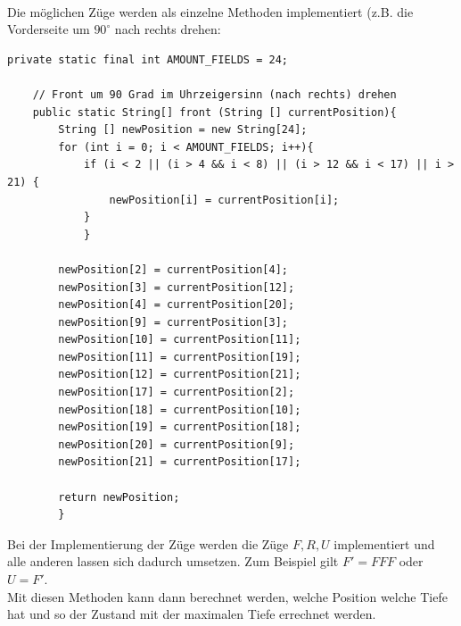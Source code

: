 \documentclass[12pt,a4paper, usenames, dvipsnames]{scrartcl}
\begin{document}
\\
Die möglichen Züge werden als einzelne Methoden implementiert (z.B. die Vorderseite um $90^\circ$ nach rechts drehen:
\begin{verbatim}
private static final int AMOUNT_FIELDS = 24;

    // Front um 90 Grad im Uhrzeigersinn (nach rechts) drehen
    public static String[] front (String [] currentPosition){
        String [] newPosition = new String[24];
        for (int i = 0; i < AMOUNT_FIELDS; i++){
            if (i < 2 || (i > 4 && i < 8) || (i > 12 && i < 17) || i > 21) {
                newPosition[i] = currentPosition[i];
            }
            }

        newPosition[2] = currentPosition[4];
        newPosition[3] = currentPosition[12];
        newPosition[4] = currentPosition[20];
        newPosition[9] = currentPosition[3];
        newPosition[10] = currentPosition[11];
        newPosition[11] = currentPosition[19];
        newPosition[12] = currentPosition[21];
        newPosition[17] = currentPosition[2];
        newPosition[18] = currentPosition[10];
        newPosition[19] = currentPosition[18];
        newPosition[20] = currentPosition[9];
        newPosition[21] = currentPosition[17];

        return newPosition;
        }
\end{verbatim}
Bei der Implementierung der Züge werden die Züge $F, R, U$ implementiert und alle anderen lassen sich dadurch umsetzen. Zum Beispiel gilt $F' = FFF$ oder $U=F'$. \\
Mit diesen Methoden kann dann berechnet werden, welche Position welche Tiefe hat und so der Zustand mit der maximalen Tiefe errechnet werden.


\newpage 
\end{document}
